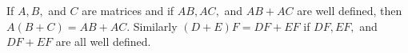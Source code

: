 If $A, B,$ and $C$ are matrices and if $AB, AC,$ and $AB + AC$ are well defined, then $A(B + C) = AB + AC$. Similarly $(D + E)F = DF + EF$ if $DF, EF,$ and $DF + EF$ are all well defined.

